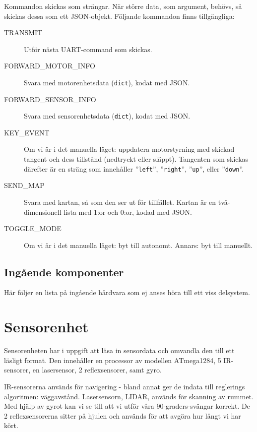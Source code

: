 \documentclass[a4paper,11pt]{article}
\begin{document}
Kommandon skickas som strängar. När större data, som argument, behövs, så skickas dessa som ett JSON-objekt. Följande kommandon finns tillgängliga:

\begin{description}
    \item [TRANSMIT] Utför nästa UART-command som skickas.
    \item [FORWARD\_MOTOR\_INFO] Svara med motorenhetsdata (\texttt{dict}), kodat med JSON.
    \item [FORWARD\_SENSOR\_INFO] Svara med sensorenhetsdata (\texttt{dict}), kodat med JSON.
    \item [KEY\_EVENT] Om vi är i det manuella läget: uppdatera motorstyrning med skickad tangent och dess tillstånd (nedtryckt eller släppt). Tangenten som skickas därefter är en sträng som innehåller ''\texttt{left}'', ''\texttt{right}'', ''\texttt{up}'', eller ''\texttt{down}''.
    \item [SEND\_MAP] Svara med kartan, så som den ser ut för tillfället. Kartan är en två-dimensionell lista med 1:or och 0:or, kodad med JSON.
    \item [TOGGLE\_MODE] Om vi är i det manuella läget: byt till autonomt. Annars: byt till manuellt.
\end{description}

\subsection{Ingående komponenter}
Här följer en lista på ingående hårdvara som ej anses höra till ett viss delsystem.

\begin{HardwareList}
\end{HardwareList}

\clearpage
\section{Sensorenhet} \label{sec:system1}
Sensorenheten har i uppgift att läsa in sensordata och omvandla den till ett läsligt format. Den innehåller en processor av modellen ATmega1284, 5 IR-sensorer, en lasersensor, 2 reflexsensorer, samt gyro.

IR-sensorerna används för navigering - bland annat ger de indata till reglerings algoritmen: väggavstånd. Lasersensorn, LIDAR, används för skanning av rummet. Med hjälp av gyrot kan vi se till att vi utför våra 90-graders-svängar korrekt. De 2 reflexsensorerna sitter på hjulen och används för att avgöra hur långt vi har kört.
\end{document}
